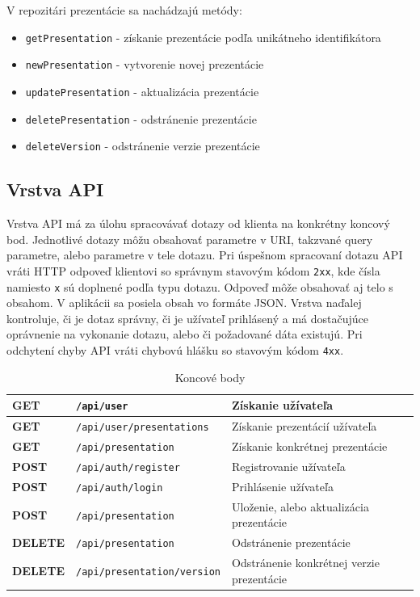 \vspace{5mm}
V repozitári prezentácie sa nachádzajú metódy: 
    \begin{itemize}
        \item\texttt{getPresentation} - získanie prezentácie podľa unikátneho identifikátora
        \item\texttt{newPresentation} - vytvorenie novej prezentácie
        \item\texttt{updatePresentation} - aktualizácia prezentácie
        \item\texttt{deletePresentation} - odstránenie prezentácie
        \item\texttt{deleteVersion} - odstránenie verzie prezentácie
    \end{itemize}
    
    \subsection*{Vrstva API}
Vrstva API má za úlohu spracovávať dotazy od klienta na konkrétny koncový bod. Jednotlivé dotazy môžu obsahovať parametre v URI, takzvané query parametre, alebo parametre v tele dotazu. Pri úspešnom spracovaní dotazu API vráti HTTP odpoveď klientovi so správnym stavovým kódom \texttt{2xx}, kde čísla namiesto \texttt{x} sú doplnené podľa typu dotazu. Odpoveď môže obsahovať aj telo s obsahom. V aplikácii sa posiela obsah vo formáte JSON. Vrstva naďalej kontroluje, či je dotaz správny, či je užívateľ prihlásený a má dostačujúce oprávnenie na vykonanie dotazu, alebo či požadované dáta existujú. Pri odchytení chyby API vráti chybovú hlášku so stavovým kódom \texttt{4xx}.

\begin{table}[H]
    \centering
    \caption{Koncové body}
    \label{table:endpoints}
    \begin{tabular}{ |>{\centering\arraybackslash}m{18mm}|p{50mm}|p{70mm}|}
    \hline
    \textbf{GET} & \texttt{/api/user} & Získanie užívateľa  \\
    \hline
    \textbf{GET} & \texttt{/api/user/presentations} & Získanie prezentácií užívateľa  \\
    \hline
    \textbf{GET} & \texttt{/api/presentation} & Získanie konkrétnej prezentácie  \\
    \hline
    \textbf{POST} & \texttt{/api/auth/register} & Registrovanie užívateľa \\
    \hline
    \textbf{POST} & \texttt{/api/auth/login} & Prihlásenie užívateľa \\
    \hline
    \textbf{POST} & \texttt{/api/presentation} & Uloženie, alebo aktualizácia prezentácie  \\
    \hline
    \textbf{DELETE} & \texttt{/api/presentation} & Odstránenie prezentácie  \\
    \hline
    \textbf{DELETE} & \texttt{/api/presentation/version} & Odstránenie konkrétnej verzie prezentácie \\
    \hline
    \end{tabular}
\end{table}
